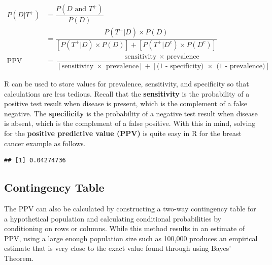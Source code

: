 \begin{align*}
P(D|T^{+}) &= \dfrac{P(D \text{ and } T^{+})}{P(D)} \\
&= \dfrac{P(T^{+}|D) \times P(D)}{[P(T^{+}|D) \times P(D)] + [P(T^{+}|D^c) \times P(D^c)]} \\
\text{PPV} &= \dfrac{\text{sensitivity } \times \text{ prevalence}}{[\text{sensitivity } \times \text{ prevalence}] + [\text{(1 - specificity) } \times \text{ (1 - prevalence)}]}
\end{align*}

\textsf{R} can be used to store values for prevalence, sensitivity, and specificity so that calculations are less tedious. Recall that the \textbf{sensitivity} is the probability of a positive test result when disease is present, which is the complement of a false negative. The \textbf{specificity} is the probability of a negative test result when disease is absent, which is the complement of a false positive.  With this in mind, solving for the \textbf{positive predictive value (PPV)} is quite easy in \textsf{R} for the breast cancer example as follows.  

\begin{knitrout}
\color{fgcolor}\begin{kframe}
\begin{alltt}
 \hlkwb{=} 
 \hlkwb{=}  \hlopt{-} 
 \hlkwb{=}  \hlopt{-} 

 \hlkwb{=} \hlopt{*}  
 \hlkwb{=}  \hlopt{+} \hlstd{((}\hlopt{-}\hlopt{*}\hlstd{(}\hlopt{-}  
 \hlkwb{=}  \hlopt{/} 

\end{alltt}
\begin{verbatim}
## [1] 0.04274736
\end{verbatim}
\end{kframe}
\end{knitrout}


\subsection{Contingency Table}

The PPV can also be calculated by constructing a two-way contingency table for a hypothetical population and calculating conditional probabilities by conditioning on rows or columns. While this method results in an estimate of PPV, using a large enough population size such as 100,000 produces an empirical estimate that is very close to the exact value found through using Bayes' Theorem. 

